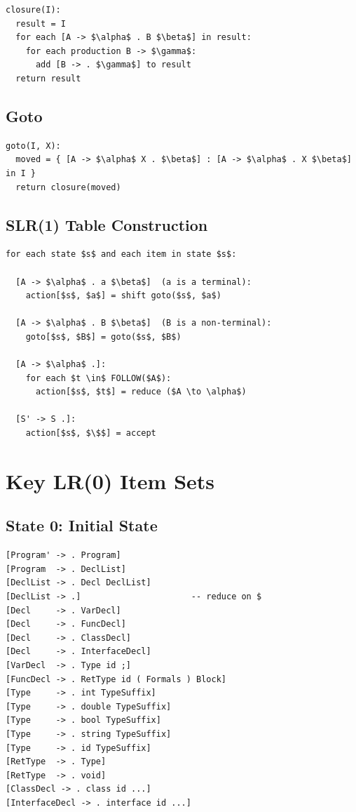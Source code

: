 \documentclass[12pt,a4paper]{article}
\begin{document}
\begin{lstlisting}[style=pseudo]
closure(I):
  result = I
  for each [A -> $\alpha$ . B $\beta$] in result:
    for each production B -> $\gamma$:
      add [B -> . $\gamma$] to result
  return result
\end{lstlisting}

\subsection{Goto}

\begin{lstlisting}[style=pseudo]
goto(I, X):
  moved = { [A -> $\alpha$ X . $\beta$] : [A -> $\alpha$ . X $\beta$] in I }
  return closure(moved)
\end{lstlisting}

\subsection{SLR(1) Table Construction}

\begin{lstlisting}[style=pseudo]
for each state $s$ and each item in state $s$:

  [A -> $\alpha$ . a $\beta$]  (a is a terminal):
    action[$s$, $a$] = shift goto($s$, $a$)

  [A -> $\alpha$ . B $\beta$]  (B is a non-terminal):
    goto[$s$, $B$] = goto($s$, $B$)

  [A -> $\alpha$ .]:
    for each $t \in$ FOLLOW($A$):
      action[$s$, $t$] = reduce ($A \to \alpha$)

  [S' -> S .]:
    action[$s$, $\$$] = accept
\end{lstlisting}

\section{Key LR(0) Item Sets}

\subsection{State 0: Initial State}

\begin{lstlisting}[style=pseudo]
[Program' -> . Program]
[Program  -> . DeclList]
[DeclList -> . Decl DeclList]
[DeclList -> .]                      -- reduce on $
[Decl     -> . VarDecl]
[Decl     -> . FuncDecl]
[Decl     -> . ClassDecl]
[Decl     -> . InterfaceDecl]
[VarDecl  -> . Type id ;]
[FuncDecl -> . RetType id ( Formals ) Block]
[Type     -> . int TypeSuffix]
[Type     -> . double TypeSuffix]
[Type     -> . bool TypeSuffix]
[Type     -> . string TypeSuffix]
[Type     -> . id TypeSuffix]
[RetType  -> . Type]
[RetType  -> . void]
[ClassDecl -> . class id ...]
[InterfaceDecl -> . interface id ...]
\end{lstlisting}
\end{document}
